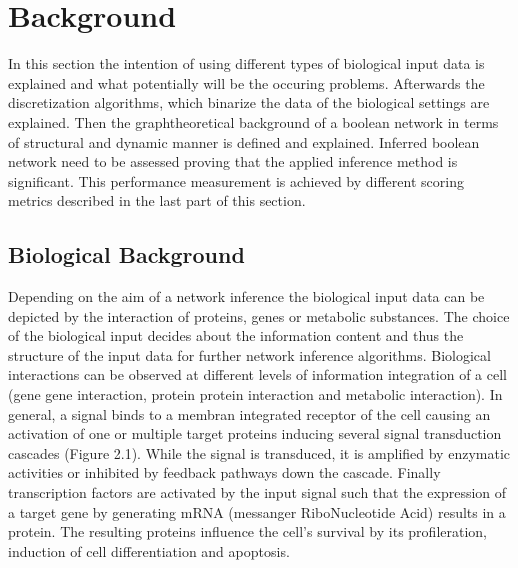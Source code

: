 \chapter{Background}
In this section the intention of using different types of biological input data is explained and what potentially will be the occuring problems. Afterwards the discretization algorithms, which binarize the data of the biological settings are explained. Then the graphtheoretical background of a boolean network in terms of structural and dynamic manner is defined and explained. Inferred boolean network need to be assessed proving that the applied inference method is significant. This performance measurement is achieved by different scoring metrics described in the last part of this section.


\section{Biological Background}

Depending on the aim of a network inference the biological input data can be depicted by the interaction of proteins, genes or metabolic substances. The choice of the biological input decides about the information content and thus the structure of the input data for further network inference algorithms. Biological interactions can be observed at different levels of information integration of a cell (gene gene interaction, protein protein interaction and metabolic interaction). 
In general, a signal binds to a membran integrated receptor of the cell causing an activation of one or multiple target proteins inducing several signal transduction cascades (Figure 2.1). While the signal is transduced, it is amplified by enzymatic activities or inhibited by feedback pathways down the cascade. Finally transcription factors are activated by the input signal such that the expression of a target gene by generating \gls{mRNA} (messanger RiboNucleotide Acid) results in a protein. The resulting proteins influence the cell's survival by its profileration, induction of cell differentiation and apoptosis.


